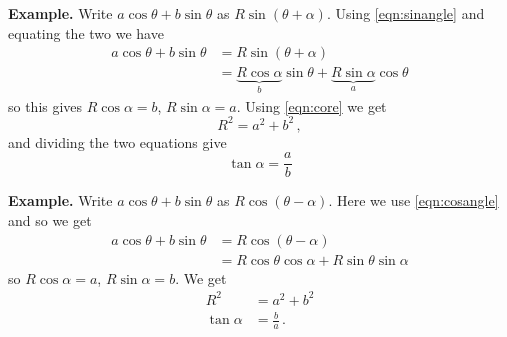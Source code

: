 \documentclass{article}
\begin{document}
\textbf{Example.} Write $a\cos\theta + b\sin\theta$ as $R\sin(\theta+\alpha)$. Using \eqref{eqn:sinangle} and equating the two we have 
\begin{align}
    a\cos\theta + b\sin\theta&= R\sin(\theta+\alpha)\\
    &= \underbrace{R\cos\alpha}_{b}\sin\theta + \underbrace{R\sin\alpha}_a\cos\theta
\end{align}
so this gives $R\cos\alpha = b$, $R\sin\alpha=a$. Using \eqref{eqn:core} we get
\[
R^2=a^2+b^2\,,
\]
and dividing the two equations give
\[
\tan\alpha=\frac{a}{b}
\]

\textbf{Example.} Write $a\cos\theta+b\sin\theta$ as $R\cos(\theta-\alpha)$. Here we use \eqref{eqn:cosangle} and so we get
\begin{align}
    a\cos\theta + b\sin\theta&=R\cos(\theta-\alpha)\\
    &=R\cos\theta\cos\alpha + R\sin\theta\sin\alpha
\end{align}
so $R\cos\alpha = a$, $R\sin\alpha = b$. We get
\begin{align}
    R^2&=a^2+b^2\\
    \tan\alpha&=\frac{b}{a}\,.
\end{align}
\end{document}
